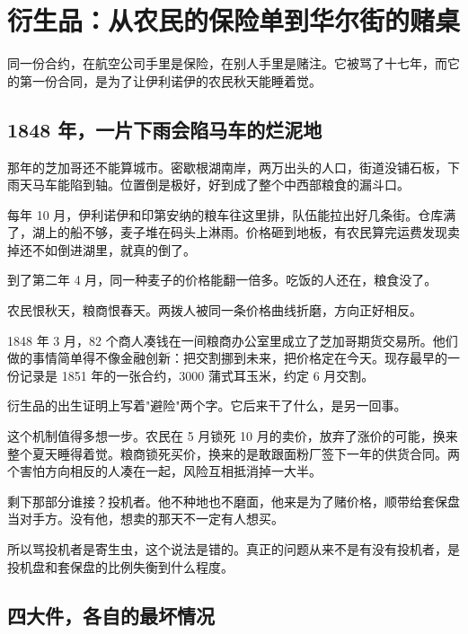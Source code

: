 \chapter{衍生品：从农民的保险单到华尔街的赌桌}

\begin{ledetext}
同一份合约，在航空公司手里是保险，在别人手里是赌注。它被骂了十七年，而它的第一份合同，是为了让伊利诺伊的农民秋天能睡着觉。
\end{ledetext}

\section{1848 年，一片下雨会陷马车的烂泥地}

那年的芝加哥还不能算城市。密歇根湖南岸，两万出头的人口，街道没铺石板，下雨天马车能陷到轴。位置倒是极好，好到成了整个中西部粮食的漏斗口。

每年 10 月，伊利诺伊和印第安纳的粮车往这里排，队伍能拉出好几条街。仓库满了，湖上的船不够，麦子堆在码头上淋雨。价格砸到地板，有农民算完运费发现卖掉还不如倒进湖里，就真的倒了。

到了第二年 4 月，同一种麦子的价格能翻一倍多。吃饭的人还在，粮食没了。

农民恨秋天，粮商恨春天。两拨人被同一条价格曲线折磨，方向正好相反。

1848 年 3 月，82 个商人凑钱在一间粮商办公室里成立了芝加哥期货交易所。他们做的事情简单得不像金融创新：把交割挪到未来，把价格定在今天。现存最早的一份记录是 1851 年的一张合约，3000 蒲式耳玉米，约定 6 月交割。

\begin{pullquote}{}
衍生品的出生证明上写着"避险"两个字。它后来干了什么，是另一回事。
\end{pullquote}

这个机制值得多想一步。农民在 5 月锁死 10 月的卖价，放弃了涨价的可能，换来整个夏天睡得着觉。粮商锁死买价，换来的是敢跟面粉厂签下一年的供货合同。两个害怕方向相反的人凑在一起，风险互相抵消掉一大半。

剩下那部分谁接？投机者。他不种地也不磨面，他来是为了赌价格，顺带给套保盘当对手方。没有他，想卖的那天不一定有人想买。

所以骂投机者是寄生虫，这个说法是错的。真正的问题从来不是有没有投机者，是投机盘和套保盘的比例失衡到什么程度。

\section{四大件，各自的最坏情况}

